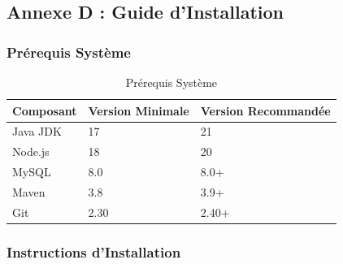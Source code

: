 \documentclass[12pt,a4paper]{article}
\begin{document}
\subsection{Annexe D : Guide d'Installation}

\subsubsection{Prérequis Système}

\begin{table}[H]
\centering
\begin{tabular}{|l|l|l|}
\hline
\textbf{Composant} & \textbf{Version Minimale} & \textbf{Version Recommandée} \\
\hline
Java JDK & 17 & 21 \\
Node.js & 18 & 20 \\
MySQL & 8.0 & 8.0+ \\
Maven & 3.8 & 3.9+ \\
Git & 2.30 & 2.40+ \\
\hline
\end{tabular}
\caption{Prérequis Système}
\end{table}

\subsubsection{Instructions d'Installation}
\end{document}
